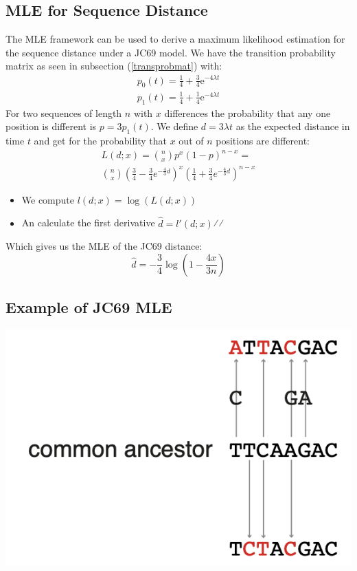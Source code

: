\documentclass{article}
\begin{document}
\begin{multicols*}{3}
\subsection{MLE for Sequence Distance}
The MLE framework can be used to derive a maximum likelihood estimation for the sequence distance under a JC69 model. 
We have the transition probability matrix as seen in subsection (\ref{transprobmat}) with:
\begin{align*}
    p_0(t) = \frac{1}{4} + \frac{3}{4}\text{e}^{-4\lambda t}\\
    p_1(t) = \frac{1}{4} + \frac{1}{4}\text{e}^{-4\lambda t}
\end{align*}
For two sequences of length $n$ with $x$ differences the probability that any one position is different is $p = 3p_1(t)$. We define $d = 3\lambda t$ as the expected distance in time $t$ and get for the probability that $x$ out of $n$ positions are different: \begin{align*}
L(d;x) = {n \choose x} p^{x}(1-p)^{n-x}=\\
{n \choose x}
\left(\frac{3}{4}-\frac{3}{4} e^{-\frac{4}{3} d}\right)^{x}\left(\frac{1}{4}+\frac{3}{4} e^{-\frac{4}{3} d}\right)^{n-x}
\end{align*}
\begin{itemize}
    \item We compute $l(d;x) = \log(L(d;x))$
    \item An calculate the first derivative $\hat{d} = l'(d;x)$⁄⁄
\end{itemize}

Which gives us the MLE of the JC69 distance: 
$$\hat{d} = -\frac{3}{4}\log\left(1-\frac{4x}{3n}\right)$$

\subsection{Example of JC69 MLE}

\begin{center}
    \includegraphics[width=0.5\linewidth]{mlejc69.png}
\end{center}


\end{multicols*}
\end{document}
